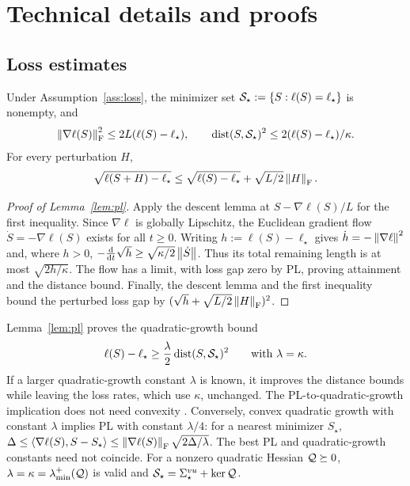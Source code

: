 \section{Technical details and proofs}\label{app:technical-details}\label{app:convergence-proofs}
\subsection{Loss estimates}\label{app:proofs}
\begin{lemma}\label{lem:pl}
Under Assumption~\ref{ass:loss}, the minimizer set
$\mathcal S_\star:=\{S:\ell(S)=\ell_\star\}$ is nonempty, and
\begin{equation}\label{eq:pl-consequences}
\left\lVert \nabla\ell(S) \right\rVert_{\mathrm{F}}^2\le2L(\ell(S)-\ell_\star),\qquad
\operatorname{dist}(S,\mathcal S_\star)^2\le2(\ell(S)-\ell_\star)/\kappa.
\end{equation}
For every perturbation $H$,
\begin{equation}\label{eq:perturb}
\sqrt{\ell(S+H)-\ell_\star}
\le\sqrt{\ell(S)-\ell_\star}+\sqrt{L/2}\left\lVert H \right\rVert_{\mathrm{F}}.
\end{equation}
\end{lemma}

\begin{proof}[Proof of Lemma~\ref{lem:pl}]

Apply the descent lemma at $S-\nabla\ell(S)/L$ for the first inequality.
Since $\nabla\ell$ is globally Lipschitz, the Euclidean gradient flow
$\dot S=-\nabla\ell(S)$ exists for all $t\ge0$.
Writing $h:=\ell(S)-\ell_\star$ gives $\dot h=-\left\lVert \nabla\ell \right\rVert^2$ and,
where $h>0$, $-\frac{\mathrm{d}}{\mathrm{d} t}\sqrt h\ge\sqrt{\kappa/2}\left\lVert \dot S \right\rVert$.
Thus its total remaining length is at most $\sqrt{2h/\kappa}$.
The flow has a limit, with loss gap zero by PL, proving attainment and the distance
bound. Finally, the descent lemma and the first inequality bound the
perturbed loss gap by $(\sqrt h+\sqrt{L/2}\left\lVert H \right\rVert_{\mathrm{F}})^2$.
\end{proof}
\begin{remark}
Lemma~\ref{lem:pl} proves the quadratic-growth bound
\begin{equation}\label{eq:quadratic-growth}
 \ell(S)-\ell_\star\ge\frac\lambda2\operatorname{dist}(S,\mathcal S_\star)^2
 \qquad\text{with }\lambda=\kappa.
\end{equation}
If a larger quadratic-growth constant $\lambda$ is known, it improves
the distance bounds while leaving the loss rates, which use $\kappa$, unchanged.
The PL-to-quadratic-growth implication does not need convexity
\citep{KarimiNutiniSchmidt2016}. Conversely, convex quadratic growth
with constant \(\lambda\) implies PL with constant \(\lambda/4\):
for a nearest minimizer \(S_\star\),
\(\Delta\le\left\langle \nabla\ell(S),S-S_\star \right\rangle
\le\left\lVert \nabla\ell(S) \right\rVert_{\mathrm{F}}\sqrt{2\Delta/\lambda}\).
The best PL and quadratic-growth constants need not coincide.
For a nonzero quadratic Hessian $\mathcal Q\succeq0$,
$\lambda=\kappa=\lambda_{\min}^{+}(\mathcal Q)$ is valid and
$\mathcal S_\star=\Sigma^{vu}_\star+\operatorname{ker}\mathcal Q$.
\end{remark}

